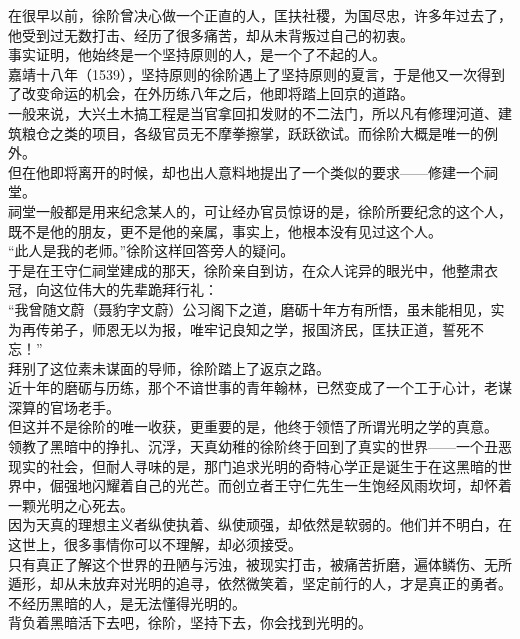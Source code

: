 \begin{multicols}{\theparacolNo}
在很早以前，徐阶曾决心做一个正直的人，匡扶社稷，为国尽忠，许多年过去了，他受到过无数打击、经历了很多痛苦，却从未背叛过自己的初衷。\\

事实证明，他始终是一个坚持原则的人，是一个了不起的人。\\

嘉靖十八年（1539），坚持原则的徐阶遇上了坚持原则的夏言，于是他又一次得到了改变命运的机会，在外历练八年之后，他即将踏上回京的道路。\\

一般来说，大兴土木搞工程是当官拿回扣发财的不二法门，所以凡有修理河道、建筑粮仓之类的项目，各级官员无不摩拳擦掌，跃跃欲试。而徐阶大概是唯一的例外。\\

但在他即将离开的时候，却也出人意料地提出了一个类似的要求——修建一个祠堂。\\

祠堂一般都是用来纪念某人的，可让经办官员惊讶的是，徐阶所要纪念的这个人，既不是他的朋友，更不是他的亲属，事实上，他根本没有见过这个人。\\

“此人是我的老师。”徐阶这样回答旁人的疑问。\\

于是在王守仁祠堂建成的那天，徐阶亲自到访，在众人诧异的眼光中，他整肃衣冠，向这位伟大的先辈跪拜行礼：\\

“我曾随文蔚（聂豹字文蔚）公习阁下之道，磨砺十年方有所悟，虽未能相见，实为再传弟子，师恩无以为报，唯牢记良知之学，报国济民，匡扶正道，誓死不忘！”\\

拜别了这位素未谋面的导师，徐阶踏上了返京之路。\\

近十年的磨砺与历练，那个不谙世事的青年翰林，已然变成了一个工于心计，老谋深算的官场老手。\\

但这并不是徐阶的唯一收获，更重要的是，他终于领悟了所谓光明之学的真意。\\

领教了黑暗中的挣扎、沉浮，天真幼稚的徐阶终于回到了真实的世界——一个丑恶现实的社会，但耐人寻味的是，那门追求光明的奇特心学正是诞生于在这黑暗的世界中，倔强地闪耀着自己的光芒。而创立者王守仁先生一生饱经风雨坎坷，却怀着一颗光明之心死去。\\

因为天真的理想主义者纵使执着、纵使顽强，却依然是软弱的。他们并不明白，在这世上，很多事情你可以不理解，却必须接受。\\

只有真正了解这个世界的丑陋与污浊，被现实打击，被痛苦折磨，遍体鳞伤、无所遁形，却从未放弃对光明的追寻，依然微笑着，坚定前行的人，才是真正的勇者。\\

不经历黑暗的人，是无法懂得光明的。\\

背负着黑暗活下去吧，徐阶，坚持下去，你会找到光明的。\\
\ifnum{}
	\end{multicols}
\fi
\newpage
